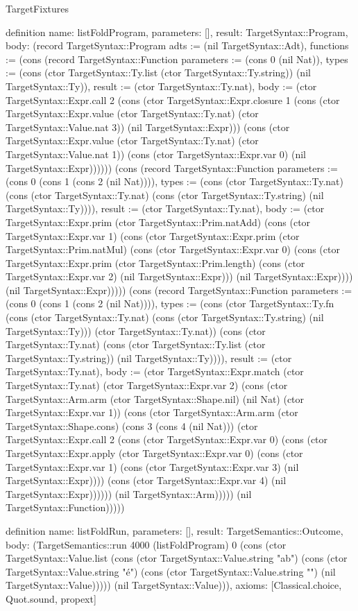 \begin{lexlean}{TargetFixtures}
\begin{semanticmodule}
definition{
  name: listFoldProgram,
  parameters: [],
  result: TargetSyntax::Program,
  body: (record TargetSyntax::Program {adts := (nil TargetSyntax::Adt), functions := (cons (record TargetSyntax::Function {parameters := (cons 0 (nil Nat)), types := (cons (ctor TargetSyntax::Ty.list (ctor TargetSyntax::Ty.string)) (nil TargetSyntax::Ty)), result := (ctor TargetSyntax::Ty.nat), body := (ctor TargetSyntax::Expr.call 2 (cons (ctor TargetSyntax::Expr.closure 1 (cons (ctor TargetSyntax::Expr.value (ctor TargetSyntax::Ty.nat) (ctor TargetSyntax::Value.nat 3)) (nil TargetSyntax::Expr))) (cons (ctor TargetSyntax::Expr.value (ctor TargetSyntax::Ty.nat) (ctor TargetSyntax::Value.nat 1)) (cons (ctor TargetSyntax::Expr.var 0) (nil TargetSyntax::Expr)))))}) (cons (record TargetSyntax::Function {parameters := (cons 0 (cons 1 (cons 2 (nil Nat)))), types := (cons (ctor TargetSyntax::Ty.nat) (cons (ctor TargetSyntax::Ty.nat) (cons (ctor TargetSyntax::Ty.string) (nil TargetSyntax::Ty)))), result := (ctor TargetSyntax::Ty.nat), body := (ctor TargetSyntax::Expr.prim (ctor TargetSyntax::Prim.natAdd) (cons (ctor TargetSyntax::Expr.var 1) (cons (ctor TargetSyntax::Expr.prim (ctor TargetSyntax::Prim.natMul) (cons (ctor TargetSyntax::Expr.var 0) (cons (ctor TargetSyntax::Expr.prim (ctor TargetSyntax::Prim.length) (cons (ctor TargetSyntax::Expr.var 2) (nil TargetSyntax::Expr))) (nil TargetSyntax::Expr)))) (nil TargetSyntax::Expr))))}) (cons (record TargetSyntax::Function {parameters := (cons 0 (cons 1 (cons 2 (nil Nat)))), types := (cons (ctor TargetSyntax::Ty.fn (cons (ctor TargetSyntax::Ty.nat) (cons (ctor TargetSyntax::Ty.string) (nil TargetSyntax::Ty))) (ctor TargetSyntax::Ty.nat)) (cons (ctor TargetSyntax::Ty.nat) (cons (ctor TargetSyntax::Ty.list (ctor TargetSyntax::Ty.string)) (nil TargetSyntax::Ty)))), result := (ctor TargetSyntax::Ty.nat), body := (ctor TargetSyntax::Expr.match (ctor TargetSyntax::Ty.nat) (ctor TargetSyntax::Expr.var 2) (cons (ctor TargetSyntax::Arm.arm (ctor TargetSyntax::Shape.nil) (nil Nat) (ctor TargetSyntax::Expr.var 1)) (cons (ctor TargetSyntax::Arm.arm (ctor TargetSyntax::Shape.cons) (cons 3 (cons 4 (nil Nat))) (ctor TargetSyntax::Expr.call 2 (cons (ctor TargetSyntax::Expr.var 0) (cons (ctor TargetSyntax::Expr.apply (ctor TargetSyntax::Expr.var 0) (cons (ctor TargetSyntax::Expr.var 1) (cons (ctor TargetSyntax::Expr.var 3) (nil TargetSyntax::Expr)))) (cons (ctor TargetSyntax::Expr.var 4) (nil TargetSyntax::Expr)))))) (nil TargetSyntax::Arm))))}) (nil TargetSyntax::Function))))})
}

definition{
  name: listFoldRun,
  parameters: [],
  result: TargetSemantics::Outcome,
  body: (TargetSemantics::run 4000 (listFoldProgram) 0 (cons (ctor TargetSyntax::Value.list (cons (ctor TargetSyntax::Value.string "ab") (cons (ctor TargetSyntax::Value.string "é") (cons (ctor TargetSyntax::Value.string "") (nil TargetSyntax::Value))))) (nil TargetSyntax::Value))),
  axioms: [Classical.choice, Quot.sound, propext]
}


\end{semanticmodule}
\end{lexlean}
